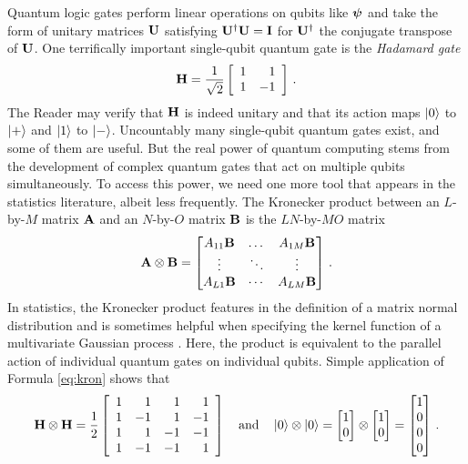 \documentclass[12pt]{article} %
\begin{document}
Quantum logic gates perform linear operations on qubits like $\boldsymbol{\psi}$ and take the form of unitary matrices $\mathbf{U}$ satisfying $\mathbf{U}^\dagger \mathbf{U}=\mathbf{I}$ for $\mathbf{U}^\dagger$ the conjugate transpose of $\mathbf{U}$. One terrifically important single-qubit quantum gate is the \emph{Hadamard gate}
\begin{align}
\mathbf{H} = \frac{1}{\sqrt{2}} \left[\begin{array}{rr}
1 & 1 \\
1 & -1 \end{array}\right] \, .
\end{align}
The Reader may verify that $\mathbf{H}$ is indeed unitary and that its action maps $\ket{0}$ to $\ket{+}$ and $\ket{1}$ to $\ket{-}$.  Uncountably many single-qubit quantum gates exist, and some of them are useful. But the real power of quantum computing stems from the development of complex quantum gates that act on multiple qubits simultaneously.   To access this power, we need one more tool that appears in the statistics literature, albeit less frequently.  The Kronecker product between an $L$-by-$M$ matrix $\mathbf{A}$ and an $N$-by-$O$ matrix $\mathbf{B}$ is the $LN$-by-$MO$ matrix
\begin{align}\label{eq:kron}
\mathbf{A} \otimes \mathbf{B} = \begin{bmatrix}
A_{11} \mathbf{B} & \dots & A_{1M} \mathbf{B} \\
\vdots & \ddots & \vdots \\
A_{L1}\mathbf{B} & \cdots & A_{LM}  \mathbf{B}
\end{bmatrix} \, .
\end{align} 
In statistics, the Kronecker product features in the definition of a matrix normal distribution and is sometimes helpful when specifying the kernel function of a multivariate Gaussian process \citep{werner2008estimation}. Here, the product is equivalent to the parallel action of individual quantum gates on individual qubits.  Simple application of Formula \eqref{eq:kron} shows that
\begin{align}
\mathbf{H} \otimes \mathbf{H} = \frac{1}{2} \left[\begin{array}{rrrr}
1 & 1 & 1 & 1 \\
1 &  -1& 1 & -1 \\
1 & 1 & -1 & -1 \\
1 & -1 & -1 & 1
\end{array}\right] \quad \mbox{and} \quad \ket{0}\otimes\ket{0}=\begin{bmatrix}
1 \\ 0
\end{bmatrix} \otimes \begin{bmatrix}
1 \\ 0
\end{bmatrix} = \begin{bmatrix}
1 \\ 0 \\ 0 \\ 0
\end{bmatrix} \, .
\end{align} 
\end{document}
